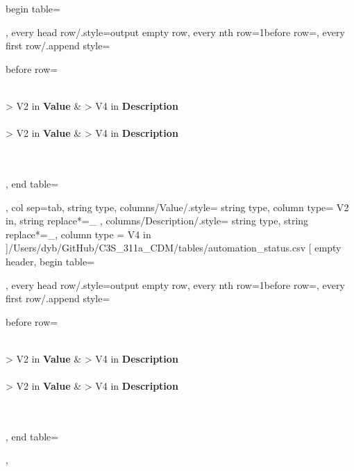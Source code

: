 \documentclass[a4paper]{article}
\begin{document}
    begin table=\begin{longtable},
    every head row/.style={output empty row},
    every nth row={1}{before row=\hline},
    every first row/.append style={
        before row={%
            \caption{Automation status}
            \label{tab:DataTable}\\
            \hline\hline {} { > {\centering}V{2 in}} { \textbf{Value}} &  { > {\centering} V{4 in} } {\textbf{Description}} \\ \hline\hline \endfirsthead
             \\
            \hline\hline {} { > {\centering}V{2 in} } { \textbf{Value}} &  { > {\centering} V{4 in} } {\textbf{Description}} \\ \hline\hline \endhead
             \\
            \endfoot
            \hline
             \\ 
            \endlastfoot
        }
    },
    end table=\end{longtable},
    col sep=tab,
    string type,
    columns/Value/.style={
            string type, 
            column type= V{2 in}, 
            string replace*={_}{}
        },
    columns/Description/.style={
            string type, 
            string replace*={_}{},
            column type = V{4 in}
        }
    ]{/Users/dyb/GitHub/C3S_311a_CDM/tables/automation_status.csv}
\pgfplotstabletypeset[
    empty header,
    begin table=\begin{longtable},
    every head row/.style={output empty row},
    every nth row={1}{before row=\hline},
    every first row/.append style={
        before row={%
            \caption{Calibration status}
            \label{tab:DataTable}\\
            \hline\hline {} { > {\centering}V{2 in}} { \textbf{Value}} &  { > {\centering} V{4 in} } {\textbf{Description}} \\ \hline\hline \endfirsthead
             \\
            \hline\hline {} { > {\centering}V{2 in} } { \textbf{Value}} &  { > {\centering} V{4 in} } {\textbf{Description}} \\ \hline\hline \endhead
             \\
            \endfoot
            \hline
             \\ 
            \endlastfoot
        }
    },
    end table=\end{longtable},
\end{document}
